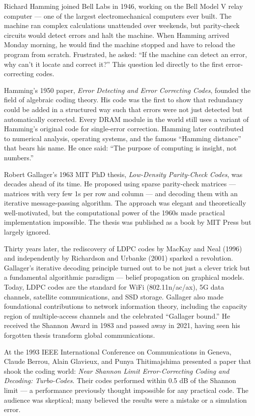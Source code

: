 Richard Hamming joined Bell Labs in 1946, working on the Bell Model V relay computer — one of the largest electromechanical computers ever built. The machine ran complex calculations unattended over weekends, but parity-check circuits would detect errors and halt the machine. When Hamming arrived Monday morning, he would find the machine stopped and have to reload the program from scratch. Frustrated, he asked: ``If the machine can detect an error, why can't it locate and correct it?'' This question led directly to the first error-correcting codes.

Hamming's 1950 paper, \emph{Error Detecting and Error Correcting Codes}, founded the field of algebraic coding theory. His code was the first to show that redundancy could be added in a structured way such that errors were not just detected but automatically corrected. Every DRAM module in the world still uses a variant of Hamming's original code for single-error correction. Hamming later contributed to numerical analysis, operating systems, and the famous ``Hamming distance'' that bears his name. He once said: ``The purpose of computing is insight, not numbers.''

Robert Gallager's 1963 MIT PhD thesis, \emph{Low-Density Parity-Check Codes}, was decades ahead of its time. He proposed using sparse parity-check matrices — matrices with very few 1s per row and column — and decoding them with an iterative message-passing algorithm. The approach was elegant and theoretically well-motivated, but the computational power of the 1960s made practical implementation impossible. The thesis was published as a book by MIT Press but largely ignored.

Thirty years later, the rediscovery of LDPC codes by MacKay and Neal (1996) and independently by Richardson and Urbanke (2001) sparked a revolution. Gallager's iterative decoding principle turned out to be not just a clever trick but a fundamental algorithmic paradigm — belief propagation on graphical models. Today, LDPC codes are the standard for WiFi (802.11n/ac/ax), 5G data channels, satellite communications, and SSD storage. Gallager also made foundational contributions to network information theory, including the capacity region of multiple-access channels and the celebrated ``Gallager bound.'' He received the Shannon Award in 1983 and passed away in 2021, having seen his forgotten thesis transform global communications.

At the 1993 IEEE International Conference on Communications in Geneva, Claude Berrou, Alain Glavieux, and Punya Thitimajshima presented a paper that shook the coding world: \emph{Near Shannon Limit Error-Correcting Coding and Decoding: Turbo-Codes}. Their codes performed within 0.5 dB of the Shannon limit — a performance previously thought impossible for any practical code. The audience was skeptical; many believed the results were a mistake or a simulation error.

